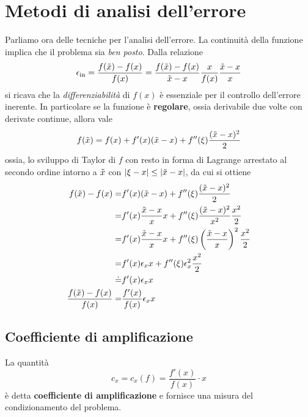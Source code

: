 \section{Metodi di analisi dell'errore}
Parliamo ora delle tecniche per l'analisi dell'errore. La continuità della funzione implica che il problema sia
\emph{ben posto}. Dalla relazione
\[
	\epsilon_\text{in} = \frac{f(\tilde{x}) - f(x)}{f(x)} =
	\frac{f(\tilde{x}) - f(x)}{\tilde{x} - x} \frac{x}{f(x)} \frac{\tilde{x} - x}{x}
\]
si ricava che la \emph{differenziabilità} di $f(x)$ è essenziale per il controllo dell'errore inerente. In
particolare se la funzione è \textbf{regolare}, ossia derivabile due volte con derivate continue, allora
vale
\[ f(\tilde{x}) = f(x) + f'(x) (\tilde{x} - x) + f''(\xi) \frac{(\tilde{x} - x)^2}{2} \]
ossia, lo sviluppo di Taylor di $f$ con resto in forma di Lagrange arrestato al secondo ordine intorno a
$\tilde{x}$ con $|\xi - x| \leq |\tilde{x} - x|$, da cui si ottiene
\begin{align*}
	f(\tilde{x}) - f(x) =              & f'(x) (\tilde{x} - x) + f''(\xi) \frac{(\tilde{x} - x)^2}{2} \\
	=                            & f'(x) \frac{\tilde{x} - x}{x} x +
	f''(\xi) \frac{(\tilde{x} - x)^2}{x^2} \frac{x^2}{2}                                  \\
	=                            & f'(x) \frac{\tilde{x} - x}{x} x +
	f''(\xi) \left( \frac{\tilde{x} - x}{x} \right)^2 \frac{x^2}{2}                       \\
	=                            & f'(x) \epsilon_x x +
	f''(\xi) \epsilon_x^2 \frac{x^2}{2}                                             \\
	\doteq                       & f'(x) \epsilon_x x                               \\
	\frac{f(\tilde{x}) - f(x)}{f(x)} = & \frac{f'(x)}{f(x)} \epsilon_x x
\end{align*}

\subsection{Coefficiente di amplificazione}
\begin{definition}
	La quantità
	\[ c_x = c_x (f) = \frac{f'(x)}{f(x)} \cdot x \]
	è detta \textbf{coefficiente di amplificazione} e fornisce una misura del condizionamento del problema.
\end{definition}

